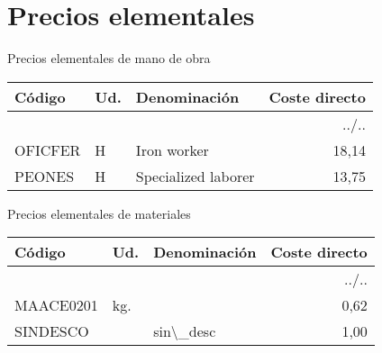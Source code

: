 \documentclass{book}%
\begin{document}
%
\normalsize%
\part{Precios elementales}%
\label{sec:Precioselementales}%
\begin{center}
%
\Large%
 Precios elementales de mano de obra %
\normalsize%
\end{center}
%
\small%
\begin{longtable}{|l|l|p{4cm}|r|}%
\hline%
Código&Ud.&Denominación&Coste directo\\%
\hline%
\endhead%
\hline%
\multicolumn{4}{|r|}{../..}\\%
\hline%
\endfoot%
\hline%
\endlastfoot%
OFICFER&H&Iron worker&     18,14\\%
PEONES&H&Specialized laborer&     13,75\\%
\end{longtable}%
\normalsize%
\begin{center}
%
\Large%
 Precios elementales de materiales %
\normalsize%
\end{center}
%
\small%
\begin{longtable}{|l|l|p{4cm}|r|}%
\hline%
Código&Ud.&Denominación&Coste directo\\%
\hline%
\endhead%
\hline%
\multicolumn{4}{|r|}{../..}\\%
\hline%
\endfoot%
\hline%
\endlastfoot%
MAACE0201&kg.&&      0,62\\%
SINDESCO&&sin\textbackslash{}\_desc&      1,00\\%
\end{longtable}%
\normalsize

%
\end{document}
